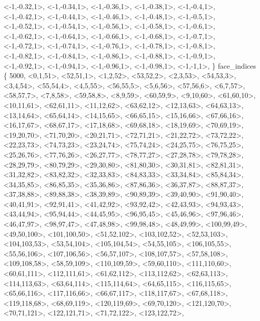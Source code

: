 \documentclass[a4paper,10pt]{article}
\begin{document}
\begin{eulernotebook}
\begin{euleroutput}
  <-1,-0.32,1>,
  <-1,-0.34,1>,
  <-1,-0.36,1>,
  <-1,-0.38,1>,
  <-1,-0.4,1>,
  <-1,-0.42,1>,
  <-1,-0.44,1>,
  <-1,-0.46,1>,
  <-1,-0.48,1>,
  <-1,-0.5,1>,
  <-1,-0.52,1>,
  <-1,-0.54,1>,
  <-1,-0.56,1>,
  <-1,-0.58,1>,
  <-1,-0.6,1>,
  <-1,-0.62,1>,
  <-1,-0.64,1>,
  <-1,-0.66,1>,
  <-1,-0.68,1>,
  <-1,-0.7,1>,
  <-1,-0.72,1>,
  <-1,-0.74,1>,
  <-1,-0.76,1>,
  <-1,-0.78,1>,
  <-1,-0.8,1>,
  <-1,-0.82,1>,
  <-1,-0.84,1>,
  <-1,-0.86,1>,
  <-1,-0.88,1>,
  <-1,-0.9,1>,
  <-1,-0.92,1>,
  <-1,-0.94,1>,
  <-1,-0.96,1>,
  <-1,-0.98,1>,
  <-1,-1,1>,
  \}
  face_indices \{ 5000,
  <0,1,51>,
  <52,51,1>,
  <1,2,52>,
  <53,52,2>,
  <2,3,53>,
  <54,53,3>,
  <3,4,54>,
  <55,54,4>,
  <4,5,55>,
  <56,55,5>,
  <5,6,56>,
  <57,56,6>,
  <6,7,57>,
  <58,57,7>,
  <7,8,58>,
  <59,58,8>,
  <8,9,59>,
  <60,59,9>,
  <9,10,60>,
  <61,60,10>,
  <10,11,61>,
  <62,61,11>,
  <11,12,62>,
  <63,62,12>,
  <12,13,63>,
  <64,63,13>,
  <13,14,64>,
  <65,64,14>,
  <14,15,65>,
  <66,65,15>,
  <15,16,66>,
  <67,66,16>,
  <16,17,67>,
  <68,67,17>,
  <17,18,68>,
  <69,68,18>,
  <18,19,69>,
  <70,69,19>,
  <19,20,70>,
  <71,70,20>,
  <20,21,71>,
  <72,71,21>,
  <21,22,72>,
  <73,72,22>,
  <22,23,73>,
  <74,73,23>,
  <23,24,74>,
  <75,74,24>,
  <24,25,75>,
  <76,75,25>,
  <25,26,76>,
  <77,76,26>,
  <26,27,77>,
  <78,77,27>,
  <27,28,78>,
  <79,78,28>,
  <28,29,79>,
  <80,79,29>,
  <29,30,80>,
  <81,80,30>,
  <30,31,81>,
  <82,81,31>,
  <31,32,82>,
  <83,82,32>,
  <32,33,83>,
  <84,83,33>,
  <33,34,84>,
  <85,84,34>,
  <34,35,85>,
  <86,85,35>,
  <35,36,86>,
  <87,86,36>,
  <36,37,87>,
  <88,87,37>,
  <37,38,88>,
  <89,88,38>,
  <38,39,89>,
  <90,89,39>,
  <39,40,90>,
  <91,90,40>,
  <40,41,91>,
  <92,91,41>,
  <41,42,92>,
  <93,92,42>,
  <42,43,93>,
  <94,93,43>,
  <43,44,94>,
  <95,94,44>,
  <44,45,95>,
  <96,95,45>,
  <45,46,96>,
  <97,96,46>,
  <46,47,97>,
  <98,97,47>,
  <47,48,98>,
  <99,98,48>,
  <48,49,99>,
  <100,99,49>,
  <49,50,100>,
  <101,100,50>,
  <51,52,102>,
  <103,102,52>,
  <52,53,103>,
  <104,103,53>,
  <53,54,104>,
  <105,104,54>,
  <54,55,105>,
  <106,105,55>,
  <55,56,106>,
  <107,106,56>,
  <56,57,107>,
  <108,107,57>,
  <57,58,108>,
  <109,108,58>,
  <58,59,109>,
  <110,109,59>,
  <59,60,110>,
  <111,110,60>,
  <60,61,111>,
  <112,111,61>,
  <61,62,112>,
  <113,112,62>,
  <62,63,113>,
  <114,113,63>,
  <63,64,114>,
  <115,114,64>,
  <64,65,115>,
  <116,115,65>,
  <65,66,116>,
  <117,116,66>,
  <66,67,117>,
  <118,117,67>,
  <67,68,118>,
  <119,118,68>,
  <68,69,119>,
  <120,119,69>,
  <69,70,120>,
  <121,120,70>,
  <70,71,121>,
  <122,121,71>,
  <71,72,122>,
  <123,122,72>,

\end{euleroutput}
\end{eulernotebook}
\end{document}
